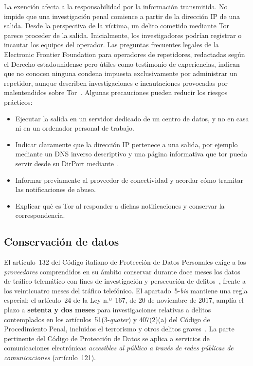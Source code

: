 La exención afecta a la responsabilidad por la información transmitida. No impide que una investigación penal comience a partir de la dirección IP de una salida. Desde la perspectiva de la víctima, un delito cometido mediante Tor parece proceder de la salida. Inicialmente, los investigadores podrían registrar o incautar los equipos del operador. Las preguntas frecuentes legales de la Electronic Frontier Foundation para operadores de repetidores, redactadas según el Derecho estadounidense pero útiles como testimonio de experiencias, indican que no conocen ninguna condena impuesta exclusivamente por administrar un repetidor, aunque describen investigaciones e incautaciones provocadas por malentendidos sobre Tor~\cite{efflegalfaq}. Algunas precauciones pueden reducir los riesgos prácticos:
\begin{itemize}
  \item Ejecutar la salida en un servidor dedicado de un centro de datos, y no en casa ni en un ordenador personal de trabajo.
  \item Indicar claramente que la dirección IP pertenece a una salida, por ejemplo mediante un DNS inverso descriptivo y una página informativa que tor pueda servir desde su DirPort mediante .
  \item Informar previamente al proveedor de conectividad y acordar cómo tramitar las notificaciones de abuso.
  \item Explicar qué es Tor al responder a dichas notificaciones y conservar la correspondencia.
\end{itemize}

\subsection{Conservación de datos}

El artículo~132 del Código italiano de Protección de Datos Personales exige a los \emph{proveedores} comprendidos en su ámbito conservar durante doce meses los datos de tráfico telemático con fines de investigación y persecución de delitos~\cite{codiceprivacy}, frente a los veinticuatro meses del tráfico telefónico. El apartado~5-\emph{bis} mantiene una regla especial: el artículo~24 de la Ley n.º~167, de 20 de noviembre de 2017, amplía el plazo a \textbf{setenta y dos meses} para investigaciones relativas a delitos contemplados en los artículos~51(3-\emph{quater}) y 407(2)(a) del Código de Procedimiento Penal, incluidos el terrorismo y otros delitos graves~\cite{legge167}. La parte pertinente del Código de Protección de Datos se aplica a servicios de comunicaciones electrónicas \emph{accesibles al público a través de redes públicas de comunicaciones} (artículo~121).

